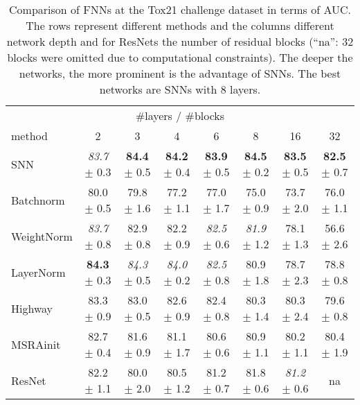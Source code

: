 \documentclass{article}
\begin{document}
\begin{table}[ht]
\caption[Comparison of FNNs at the Tox21 challenge dataset]{Comparison of FNNs at the Tox21 challenge dataset
in terms of AUC. The rows  represent different methods and the columns 
different network depth and for ResNets  the number of residual blocks 
(``na'': 32 blocks were omitted due to computational constraints).
The deeper the networks, the more prominent is the advantage of SNNs.
The best networks are SNNs with 8 layers. 
 \label{tab:tox21}}
\centering
\begin{tabular}{lccccccc}
  \toprule
  \multicolumn{8}{c}{\#layers / \#blocks} \\
  method & 2 & 3 & 4 & 6 & 8 & 16 & 32 \\ 
  \midrule 
  SNN        & {\em 83.7} \tiny $\pm$ 0.3 & {\bf 84.4} \tiny $\pm$ 0.5 & {\bf 84.2} \tiny $\pm$ 0.4 & {\bf 83.9} \tiny $\pm$ 0.5 & {\bf 84.5} \tiny $\pm$ 0.2 & {\bf 83.5} \tiny $\pm$ 0.5 & {\bf 82.5} \tiny $\pm$ 0.7 \\ 
  Batchnorm  & 80.0 \tiny $\pm$ 0.5       & 79.8 \tiny $\pm$ 1.6       & 77.2 \tiny $\pm$ 1.1       & 77.0 \tiny $\pm$ 1.7       & 75.0 \tiny $\pm$ 0.9       & 73.7 \tiny $\pm$ 2.0       & 76.0 \tiny $\pm$ 1.1 \\ 
  WeightNorm & {\em 83.7} \tiny $\pm$ 0.8 & 82.9 \tiny $\pm$ 0.8       & 82.2 \tiny $\pm$ 0.9       & {\em 82.5} \tiny $\pm$ 0.6 & {\em 81.9} \tiny $\pm$ 1.2 & 78.1 \tiny $\pm$ 1.3       & 56.6 \tiny $\pm$ 2.6 \\ 
  LayerNorm  & {\bf 84.3} \tiny $\pm$ 0.3 & {\em 84.3} \tiny $\pm$ 0.5 & {\em 84.0} \tiny $\pm$ 0.2 & {\em 82.5} \tiny $\pm$ 0.8 & 80.9 \tiny $\pm$ 1.8       & 78.7 \tiny $\pm$ 2.3       & 78.8 \tiny $\pm$ 0.8 \\ 
  Highway    & 83.3 \tiny $\pm$ 0.9       & 83.0 \tiny $\pm$ 0.5       & 82.6 \tiny $\pm$ 0.9       & 82.4 \tiny $\pm$ 0.8       & 80.3 \tiny $\pm$ 1.4       & 80.3 \tiny $\pm$ 2.4       & 79.6 \tiny $\pm$ 0.8 \\ 
  MSRAinit     & 82.7 \tiny $\pm$ 0.4       & 81.6 \tiny $\pm$ 0.9       & 81.1 \tiny $\pm$ 1.7       & 80.6 \tiny $\pm$ 0.6       & 80.9 \tiny $\pm$ 1.1       & 80.2 \tiny $\pm$ 1.1       & 80.4 \tiny $\pm$ 1.9 \\ 
  ResNet    & 82.2 \tiny $\pm$ 1.1       & 80.0 \tiny $\pm$ 2.0       & 80.5 \tiny $\pm$ 1.2       &   81.2 \tiny $\pm$  0.7                       & 81.8 \tiny $\pm$ 0.6       & {\em 81.2} \tiny $\pm$ 0.6 &   na \\ 
   \bottomrule
\end{tabular}
\end{table}
\end{document}
